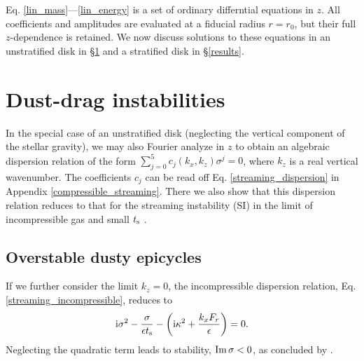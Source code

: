 
Eq. \ref{lin_mass}---\ref{lin_energy} is a set of ordinary
differntial equations in $z$. All coefficients and amplitudes are
evaluated at a fiducial radius $r=r_0$, but their full $z$-dependence
is retained. We now discuss solutions to these equations in an unstratified disk 
in \S\ref{si} and a stratified disk in \S\ref{results}.  
 

\section{Dust-drag instabilities}\label{si}
In the special case of an unstratified disk (neglecting the vertical
component of the stellar gravity), we may also Fourier analyze in $z$
to obtain an algebraic dispersion relation of the form  
$\sum_{j=0}^{5}c_j(k_x,k_z)\sigma^j = 0$, where $k_z$ is a real
vertical wavenumber. The coefficients $c_j$ can be read 
off Eq. \ref{streaming_dispersion} in  Appendix \ref{compressible_streaming}. 
There we also show that this dispersion relation reduces to that for
the streaming instability (SI) in the limit of incompressible gas and small
$t_\mathrm{s}$ \citep{youdin05a,jacquet11}.   
 
\subsection{Overstable dusty epicycles}
If we further consider the limit $k_z=0$, the incompressible dispersion
relation, Eq. \ref{streaming_incompressible}, reduces to 
\begin{align}      %
\ii \sigma^2 - \frac{\sigma}{\epsilon \tstop}  - \left(\ii \kappa^2 +
  \frac{k_xF_r}{\epsilon}\right) = 0. \label{kz_zero_si}
\end{align} 
Neglecting the quadratic term leads to stability, $\operatorname{Im}{\sigma}<0$,
as concluded by \cite{youdin05a}.  


